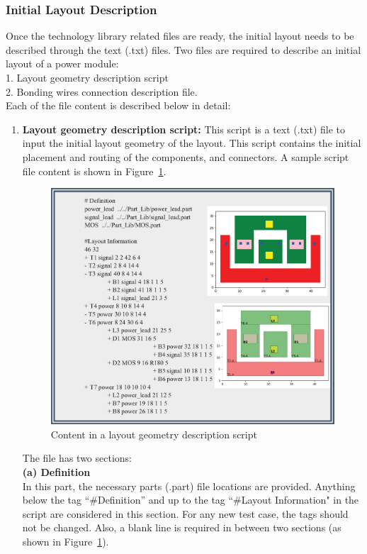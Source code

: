 \documentclass[11pt]{article}
\begin{document}
\subsubsection{Initial Layout Description}
\label{sec-2-2-2}
Once the technology library related files are ready, the initial layout needs to be described through the text (.txt) files. Two files are required to describe an initial layout of a power module:\\
1. Layout geometry description script\\
2. Bonding wires connection description file.\\
Each of the file content is described below in detail:
\begin{enumerate}

    \item \textbf{Layout geometry description script:} This script is a text (.txt) file to input the initial layout geometry of the layout. This script contains the initial placement and routing of the components, and connectors. A sample script file content is shown in Figure~\ref{layout_script}.
    \begin{figure}[t]
    \includegraphics[width=\linewidth]{figs/v_1.9_figs/init_layout.eps}
    \caption{Content in a layout geometry description script}
    \label{layout_script}
    \end{figure}
    The file has two sections:\\
    \textbf{(a) Definition}\\
    In this part, the necessary parts (.part) file locations are provided. Anything below the tag “\#Definition” and up to the tag “\#Layout Information" in the script are considered in this section. For any new test case, the tags should not be changed. Also, a blank line is required in between two sections (as shown in Figure~\ref{layout_script}).\\

\end{enumerate}
\end{document}
